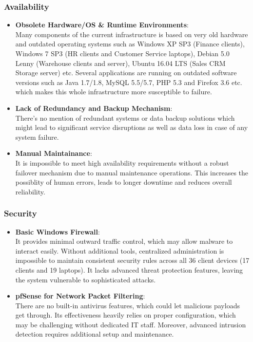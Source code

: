 \documentclass{llncs}
\begin{document}
\subsubsection*{Availability}
\begin{itemize}
    \item \textbf{Obsolete Hardware/OS \& Runtime Environments}:
          \\
          Many components of the current infrastructure is based on very old hardware and outdated operating systems such as
          Windows XP SP3 (Finance clients), Windows 7 SP3 (HR clients and Customer Service laptops), Debian 5.0 Lenny (Warehouse clients and server),
          Ubuntu 16.04 LTS (Sales CRM Storage server) etc. Several applications are running on outdated software versions such as Java 1.7/1.8,
          MySQL 5.5/5.7, PHP 5.3 and Firefox 3.6 etc. which makes this whole infrastructure more susceptible to failure.
          \\
    \item \textbf{Lack of Redundancy and Backup Mechanism}:
          \\
          There's no mention of redundant systems or data backup solutions which might lead to significant service disruptions as well as data loss in case of any system failure.
          \\
    \item \textbf{Manual Maintainance}:
          \\It is impossible to meet high availability requirements without a robust failover mechanism due to manual maintenance operations.
          This increases the possiblity of human errors, leads to longer downtime and reduces overall reliability.
          \\
\end{itemize}

\subsubsection*{Security}
\begin{itemize}
    \item \textbf{Basic Windows Firewall}:
          \\
          It provides minimal outward traffic control, which may allow malware to interact easily.
          Without additional tools, centralized administration is impossible to maintain consistent security rules across all 36 client devices (17 clients and 19 laptops).
          It lacks advanced threat protection features, leaving the system vulnerable to sophisticated attacks.
          \\
    \item \textbf{pfSense for Network Packet Filtering}:
          \\
          There are no built-in antivirus features, which could let malicious payloads get through. Its effectiveness heavily relies on proper configuration, which may be challenging without dedicated IT staff.
          Moreover, advanced intrusion detection requires additional setup and maintenance.
          \\

\end{itemize}
\end{document}
